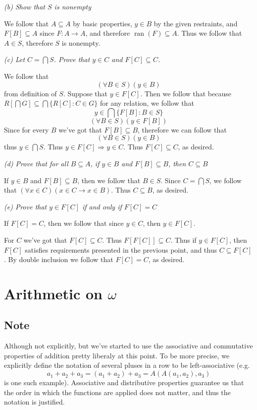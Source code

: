 \documentclass[11pt,oneside,titlepage]{book}
\DeclareMathOperator \ra {\Rightarrow}
\DeclareMathOperator \ran {ran}
\begin{document}
\textit{(b) Show that $S$ is nonempty}

We follow that $A \subseteq A$ by basic properties, $y \in B$ by the given restraints,
and $F[B] \subseteq A$ since $F: A \to A$, and therefore $\ran(F) \subseteq A$. Thus
we follow that $A \in S$, therefore $S$ is nonempty.

\textit{(c) Let $C = \bigcap S$. Prove that $y \in C$ and $F[C] \subseteq C$.}

We follow that
$$(\forall B \in S)(y \in B)$$
from definition of $S$. Suppose that $y \in F[C]$. Then we follow that
because $R[\bigcap G] \subseteq \bigcap\{R[C]: C \in G\}$ for any relation, we follow that
$$y \in \bigcap\{F[B]: B \in S\}$$
$$(\forall B \in S)(y \in F[B])$$
Since for every $B$ we've got that $F[B] \subseteq B$, therefore we can follow that
$$(\forall B \in S)(y \in B)$$
thus $y \in \bigcap S$. Thus $y \in F[C] \ra y \in C$. Thus $F[C] \subseteq C$, as desired.

\textit{(d) Prove that for all $B \subseteq A$, if $y \in B$ and $F[B] \subseteq B$, then
  $C \subseteq B$}

If $y \in B$ and $F[B] \subseteq B$, then we follow that $B \in S$. Since $C = \bigcap S$,
we follow that $(\forall x \in C) (x \in C \to x \in B)$. Thus $C \subseteq B$, as desired.

\textit{(e) Prove that $y \in F[C]$ if and only if $F[C] = C$}

If $F[C] = C$, then we follow that since $y \in C$, then $y \in F[C]$.

For $C$ we've got that $F[C] \subseteq C$. Thus $F[F[C]] \subseteq C$. Thus if $y \in F[C]$, then
$F[C]$ satisfies requirements presented in the previous point, and thus $C \subseteq F[C]$.
By double inclusion we follow that $F[C] = C$, as desired.

\section{Arithmetic on $\omega$}

\subsection*{Note}

Although not explicitly, but we've started to use the associative and commutative
properties of addition pretty liberaly at this point. To be more precise,
we explicitly define the notation of several pluses in a row to be left-associative (e.g.
$$a_1 + a_2 + a_3 = (a_1 + a_2) + a_3 = A(A(a_1, a_2), a_3) $$
is one such example). Associative and distributive properties guarantee us that the order in
which the functions are applied does not matter, and thus the notation is justified.
\end{document}
